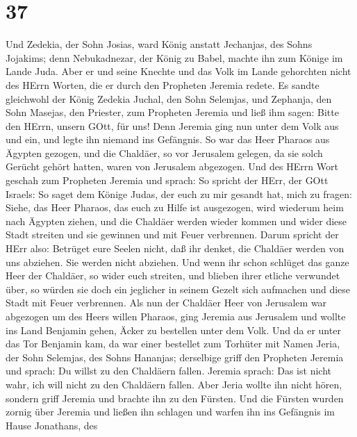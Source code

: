 \hypertarget{section-36}{%
\section{37}\label{section-36}}

 Und Zedekia, der Sohn Josias, ward König anstatt Jechanjas,
des Sohns Jojakims; denn Nebukadnezar, der König zu Babel, machte ihn
zum Könige im Lande Juda.  Aber er und seine Knechte und das
Volk im Lande gehorchten nicht des HErrn Worten, die er durch den
Propheten Jeremia redete.  Es sandte gleichwohl der König
Zedekia Juchal, den Sohn Selemjas, und Zephanja, den Sohn Masejas, den
Priester, zum Propheten Jeremia und ließ ihm sagen: Bitte den HErrn,
unsern GOtt, für uns!  Denn Jeremia ging nun unter dem Volk
aus und ein, und legte ihn niemand ins Gefängnis.  So war
das Heer Pharaos aus Ägypten gezogen, und die Chaldäer, so vor Jerusalem
gelegen, da sie solch Gerücht gehört hatten, waren von Jerusalem
abgezogen.  Und des HErrn Wort geschah zum Propheten Jeremia
und sprach:  So spricht der HErr, der GOtt Israels: So saget
dem Könige Judas, der euch zu mir gesandt hat, mich zu fragen: Siehe,
das Heer Pharaos, das euch zu Hilfe ist ausgezogen, wird wiederum heim
nach Ägypten ziehen,  und die Chaldäer werden wieder kommen
und wider diese Stadt streiten und sie gewinnen und mit Feuer
verbrennen.  Darum spricht der HErr also: Betrüget eure
Seelen nicht, daß ihr denket, die Chaldäer werden von uns abziehen. Sie
werden nicht abziehen.  Und wenn ihr schon schlüget das
ganze Heer der Chaldäer, so wider euch streiten, und blieben ihrer
etliche verwundet über, so würden sie doch ein jeglicher in seinem
Gezelt sich aufmachen und diese Stadt mit Feuer verbrennen.
 Als nun der Chaldäer Heer von Jerusalem war abgezogen um
des Heers willen Pharaos,  ging Jeremia aus Jerusalem und
wollte ins Land Benjamin gehen, Äcker zu bestellen unter dem Volk.
 Und da er unter das Tor Benjamin kam, da war einer
bestellet zum Torhüter mit Namen Jeria, der Sohn Selemjas, des Sohns
Hananjas; derselbige griff den Propheten Jeremia und sprach: Du willst
zu den Chaldäern fallen.  Jeremia sprach: Das ist nicht
wahr, ich will nicht zu den Chaldäern fallen. Aber Jeria wollte ihn
nicht hören, sondern griff Jeremia und brachte ihn zu den Fürsten.
 Und die Fürsten wurden zornig über Jeremia und ließen ihn
schlagen und warfen ihn ins Gefängnis im Hause Jonathans, des

